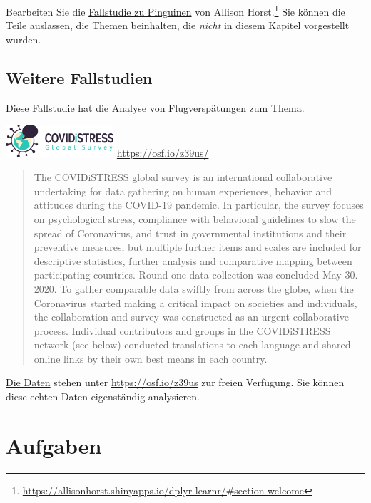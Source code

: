 \documentclass[
  a4paper,
]{scrbook}
\theoremstyle{definition}
\theoremstyle{definition}
\theoremstyle{definition}
\theoremstyle{remark}
\begin{document}
Bearbeiten Sie die
\href{https://allisonhorst.shinyapps.io/dplyr-learnr/\#section-welcome}{Fallstudie
zu Pinguinen} von Allison Horst.\footnote{\url{https://allisonhorst.shinyapps.io/dplyr-learnr/\#section-welcome}}
Sie können die Teile auslassen, die Themen beinhalten, die \emph{nicht}
in diesem Kapitel vorgestellt wurden.

\subsection{Weitere Fallstudien}\label{weitere-fallstudien}

\href{https://sebastiansauer.github.io/Fallstudie_Flights/}{Diese
Fallstudie} hat die Analyse von Flugverspätungen zum Thema.

\includegraphics[width=0.3\textwidth,height=\textheight]{img/Covidistress1.jpg}
\url{https://osf.io/z39us/}

\begin{quote}
The COVIDiSTRESS global survey is an international collaborative
undertaking for data gathering on human experiences, behavior and
attitudes during the COVID-19 pandemic. In particular, the survey
focuses on psychological stress, compliance with behavioral guidelines
to slow the spread of Coronavirus, and trust in governmental
institutions and their preventive measures, but multiple further items
and scales are included for descriptive statistics, further analysis and
comparative mapping between participating countries. Round one data
collection was concluded May 30. 2020. To gather comparable data swiftly
from across the globe, when the Coronavirus started making a critical
impact on societies and individuals, the collaboration and survey was
constructed as an urgent collaborative process. Individual contributors
and groups in the COVIDiSTRESS network (see below) conducted
translations to each language and shared online links by their own best
means in each country.
\end{quote}

\href{https://osf.io/z39us/files/osfstorage}{Die Daten} stehen unter
\url{https://osf.io/z39us} zur freien Verfügung. Sie können diese echten
Daten eigenständig analysieren.

\section{Aufgaben}\label{aufgaben-2}
\end{document}

